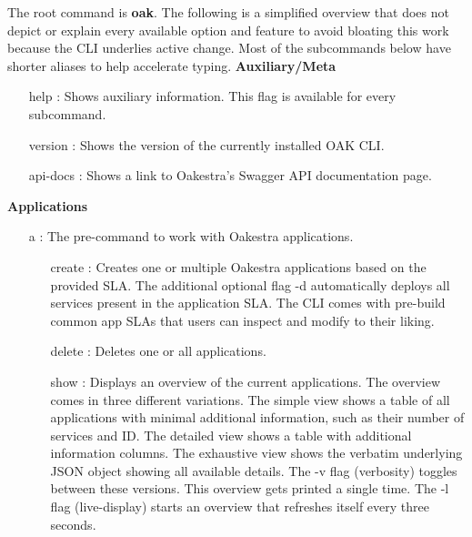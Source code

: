 The root command is \textbf{oak}.
The following is a simplified overview that does not depict or explain every available option and feature to avoid bloating this work because the CLI underlies active change.
Most of the subcommands below have shorter aliases to help accelerate typing.
\vspace{5mm}
\newline
\textbf{Auxiliary/Meta}
\begin{itemize}
    \item [help]:
        Shows auxiliary information.
        This flag is available for every subcommand.
    \item [version]:
        Shows the version of the currently installed OAK CLI.
    \item [api-docs]:
        Shows a link to Oakestra's Swagger API documentation page.
\end{itemize}
\vspace{5mm}
\textbf{Applications}
\begin{itemize}
    \item [a]:
        The pre-command to work with Oakestra applications.
        \begin{itemize}
            \item [create]:
                Creates one or multiple Oakestra applications based on the provided SLA.
                The additional optional flag -d automatically deploys all services present in the application SLA.
                The CLI comes with pre-build common app SLAs that users can inspect and modify to their liking.
            \item [delete]:
                Deletes one or all applications.
            \item [show]:
            Displays an overview of the current applications.
            The overview comes in three different variations.
            The simple view shows a table of all applications with minimal additional information, such as their number of services and ID.
            The detailed view shows a table with additional information columns.
            The exhaustive view shows the verbatim underlying JSON object showing all available details.
            The -v flag (verbosity) toggles between these versions.
            This overview gets printed a single time.
            The -l flag (live-display) starts an overview that refreshes itself every three seconds.
        \end{itemize}
\end{itemize}
\vspace{5mm}
